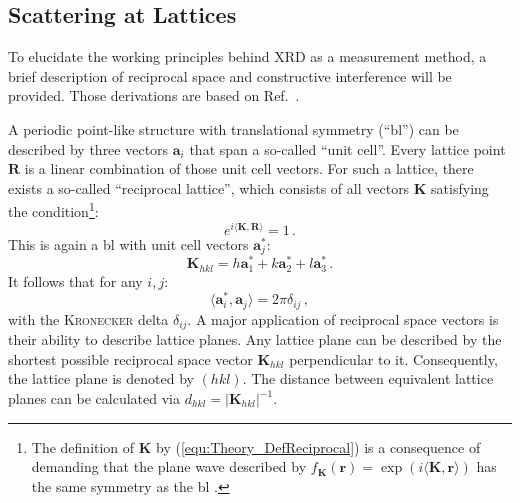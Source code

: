 \subsection{Scattering at Lattices}
To elucidate the working principles behind \gls{XRD} as a measurement method, a brief description of reciprocal space and constructive interference will be provided.
Those derivations are based on Ref.~\cite{ashcroft1976}.

A periodic point-like structure with translational symmetry (\enquote{\gls{bl}}) can be described by three vectors $\mathbf{a}_i$ that span a so-called \enquote{unit cell}.
Every lattice point $\mathbf{R}$ is a linear combination of those unit cell vectors.
For such a lattice, there exists a so-called \enquote{reciprocal lattice}, which consists of all vectors $\mathbf{K}$ satisfying the condition\footnote{
    The definition of $\textbf{K}$ by (\ref{equ:Theory_DefReciprocal}) is a consequence of demanding that the plane wave described by $f_\mathbf{K}(\mathbf{r})=\exp(i\langle\mathbf{K},\mathbf{r}\rangle)$ has the same symmetry as the \gls{bl}
        \cite{ashcroft1976}.
}:
\begin{equation}\label{equ:Theory_DefReciprocal}
    e^{i\langle\mathbf{K},\mathbf{R}\rangle}=1\,.
\end{equation}
This is again a \gls{bl} with unit cell vectors $\mathbf{a}_j^*$:
\begin{equation}
    \mathbf{K}_{hkl}=h\mathbf{a}_1^*+k\mathbf{a}_2^*+l\mathbf{a}_3^*\,.
\end{equation}
It follows that for any $i,j$:
\begin{equation}
    \langle\mathbf{a}_i^*,\mathbf{a}_j\rangle=2\pi\delta_{ij}\,,
\end{equation}
with the \textsc{Kronecker} delta $\delta_{ij}$.
A major application of reciprocal space vectors is their ability to describe lattice planes.
Any lattice plane can be described by the shortest possible reciprocal space vector $\mathbf{K}_{hkl}$ perpendicular to it.
Consequently, the lattice plane is denoted by $(hkl)$.
The distance between equivalent lattice planes can be calculated via $d_{hkl}=|\mathbf{K}_{hkl}|^{-1}$.

